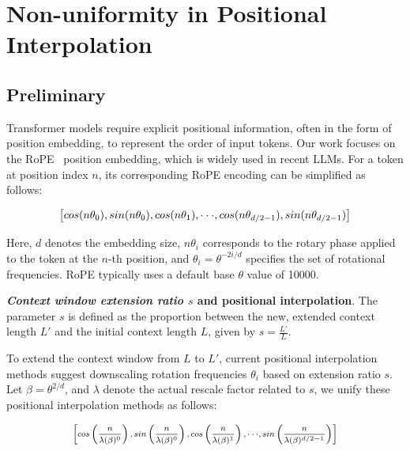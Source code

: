 \section{Non-uniformity in Positional Interpolation}
\label{sec:analysis}

\subsection{Preliminary}

Transformer models require explicit positional information, often in the form of position embedding, to represent the order of input tokens. Our work focuses on the RoPE~\cite{rope} position embedding, which is widely used in recent  LLMs. For a token at position index $n$, its corresponding RoPE encoding can be simplified as follows:

\begin{equation}
		\fontsize{7.8}{7.8} \selectfont
	\label{eq:rope}
	\left[ cos(n\theta_0), sin(n\theta_0), cos(n\theta_1), \cdot\cdot\cdot, cos(n\theta_{d/2-1}), sin(n\theta_{d/2-1}) \right]   
\end{equation}

Here, $d$ denotes the embedding size, 
$n\theta_i$ corresponds to the rotary phase applied to the token at the $n$-th position, 
and $\theta_i = \theta^{-2i/d}$ specifies the set of rotational frequencies. RoPE typically uses a default base $\theta$ value of 10000.

\textbf{\emph{Context window extension ratio $s$} and positional interpolation}. The parameter $s$ is defined as the proportion between the new, extended context length $L'$ and the initial context length $L$, given by $s=\frac{L'}{L}$.

To extend the context window from $L$ to $L'$, current positional interpolation methods suggest downscaling rotation frequencies $\theta_i$ based on extension ratio $s$. Let $\beta=\theta^{2/d}$, and $\lambda$ denote the actual rescale factor related to $s$, we   unify these positional interpolation methods as follows:

\begin{equation}	
	\fontsize{7.5}{7.5} \selectfont
	\label{eq:unified_rope}
	\begin{aligned}
		\left[cos\left(\frac{n}{\lambda(\beta)^0}\right), sin \left(\frac{n}{\lambda(\beta)^0}\right), cos\left(\frac{n}{\lambda(\beta)^1}\right), \cdot\cdot\cdot,  sin \left(\frac{n}{\lambda(\beta)^{d/2-1}}\right) \right]   
	\end{aligned}
\end{equation}

